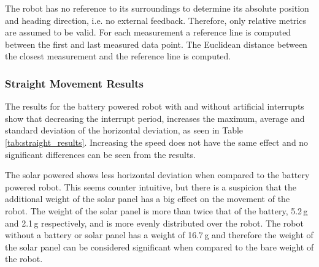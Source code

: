 The robot has no reference to its surroundings to determine its absolute position and heading direction, i.e. no external feedback.
Therefore, only relative metrics are assumed to be valid.
For each measurement a reference line is computed between the first and last measured data point.
The Euclidean distance between the closest measurement and the reference line is computed.

\subsubsection{Straight Movement Results}

The results for the battery powered robot with and without artificial interrupts show that decreasing the interrupt period, increases the maximum, average and standard deviation of the horizontal deviation, as seen in Table \ref{tab:straight_results}.
Increasing the speed does not have the same effect and no significant differences can be seen from the results.

The solar powered shows less horizontal deviation when compared to the battery powered robot.
This seems counter intuitive, but there is a suspicion that the additional weight of the solar panel has a big effect on the movement of the robot.
The weight of the solar panel is more than twice that of the battery, 5.2\,g and 2.1\,g respectively, and is more evenly distributed over the robot.
The robot without a battery or solar panel has a weight of 16.7\,g and therefore the weight of the solar panel can be considered significant when compared to the bare weight of the robot.

